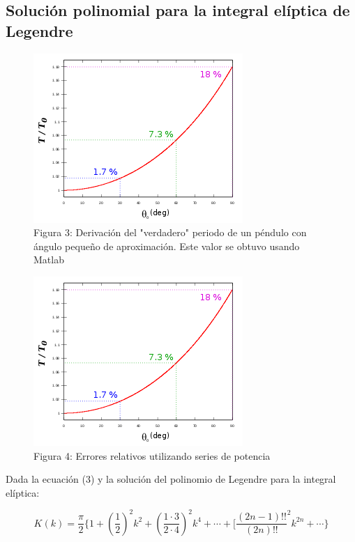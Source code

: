 \documentclass[12pt,letterpaper]{article}
\begin{document}
\subsection{Solución polinomial para la integral elíptica de Legendre}

\begin{figure}
\begin{center}
\includegraphics[scale=.3]{Pendulum3.png}
\caption{Figura 3: Derivación del "verdadero" periodo de un péndulo con ángulo pequeño de aproximación. Este valor se obtuvo usando Matlab}
\end{center}
\end{figure}

\begin{figure}
\begin{center}
\includegraphics[scale=.3]{Pendulum3.png}
\caption{Figura 4: Errores relativos utilizando series de potencia}
\end{center}
\end{figure}
Dada la ecuación (3) y la solución del polinomio de Legendre  para la integral elíptica: 

$$ K(k) = \frac{\pi}{2} \{1 + (\frac{1}{2})^2 k^2 + (\frac{1\cdotp3}{2\cdotp4})^2 k^4 + \cdots + [\frac{(2n-1)!!}{(2n)!!}^2 k^{2n} + \cdots \} $$
\end{document}
